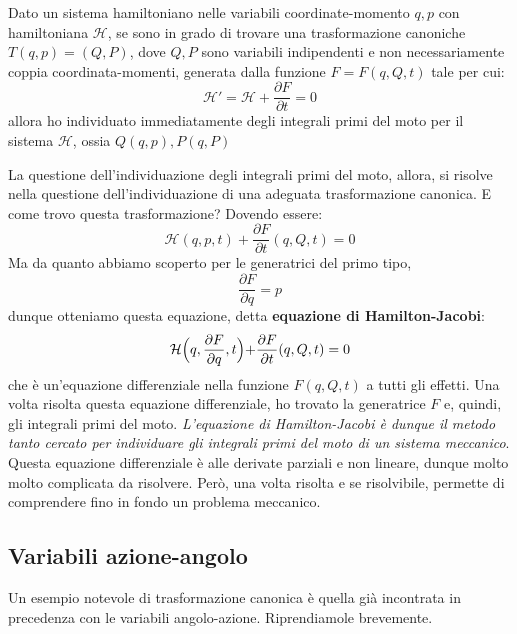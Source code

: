\documentclass[a4paper,openany]{article}
\begin{document}
	\begin{tcolorbox}
		Dato un sistema hamiltoniano nelle variabili coordinate-momento $q,p$ con hamiltoniana $\mathcal{H}$, se sono in grado di trovare una trasformazione canoniche $T(q,p) = (Q,P)$, dove $Q,P$ sono variabili indipendenti e non necessariamente coppia coordinata-momenti, generata dalla funzione $F=F(q,Q,t)$ tale per cui:
		\begin{equation}\label{key}
			\mathcal{H}' = \mathcal{H}+\dfrac{\partial F}{\partial t} = 0
		\end{equation}
		allora ho individuato immediatamente degli integrali primi del moto per il sistema $\mathcal{H}$, ossia $Q(q,p), P(q,P)$
	\end{tcolorbox}
	La questione dell'individuazione degli integrali primi del moto, allora, si risolve nella questione dell'individuazione di una adeguata trasformazione canonica. E come trovo questa trasformazione? Dovendo essere:
	\begin{equation}\label{key}
		\mathcal{H}(q,p,t)+\dfrac{\partial F}{\partial t}(q,Q,t) = 0
	\end{equation}
	Ma da quanto abbiamo scoperto per le generatrici del primo tipo,
	\begin{equation}\label{key}
		\dfrac{\partial F}{\partial q} = p
	\end{equation}
	dunque otteniamo questa equazione, detta \textbf{equazione di Hamilton-Jacobi}:
	\begin{equation}\label{key}
		\mathcal{H}\Bigl(q,\dfrac{\partial F}{\partial q},t\Bigl)+\dfrac{\partial F}{\partial t}(q,Q,t) = 0
	\end{equation}
	che è un'equazione differenziale nella funzione $F(q,Q,t)$ a tutti gli effetti. Una volta risolta questa equazione differenziale, ho trovato la generatrice $F$ e, quindi, gli integrali primi del moto. \textit{L'equazione di Hamilton-Jacobi è dunque il metodo tanto cercato per individuare gli integrali primi del moto di un sistema meccanico}. Questa equazione differenziale è alle derivate parziali e non lineare, dunque molto molto complicata da risolvere. Però, una volta risolta e se risolvibile, permette di comprendere fino in fondo un problema meccanico.
	\subsection{Variabili azione-angolo}
	Un esempio notevole di trasformazione canonica è quella già incontrata in precedenza con le variabili angolo-azione. Riprendiamole brevemente.
	
\end{document}

